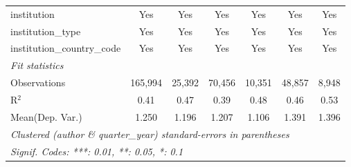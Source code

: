 \begin{tabular}{lcccccc}
   institution                  & Yes           & Yes           & Yes           & Yes          & Yes           & Yes\\  
   institution\_type            & Yes           & Yes           & Yes           & Yes          & Yes           & Yes\\  
   institution\_country\_code   & Yes           & Yes           & Yes           & Yes          & Yes           & Yes\\  
   \midrule
   \emph{Fit statistics}\\
   Observations                 & 165,994       & 25,392        & 70,456        & 10,351       & 48,857        & 8,948\\  
   R$^2$                        & 0.41          & 0.47          & 0.39          & 0.48         & 0.46          & 0.53\\  
Mean(Dep. Var.) & 1.250 & 1.196 & 1.207 & 1.106 & 1.391 & 1.396 \\
   \midrule \midrule
   \multicolumn{7}{l}{\emph{Clustered (author \& quarter\_year) standard-errors in parentheses}}\\
   \multicolumn{7}{l}{\emph{Signif. Codes: ***: 0.01, **: 0.05, *: 0.1}}\\
\end{tabular}
\par\endgroup
